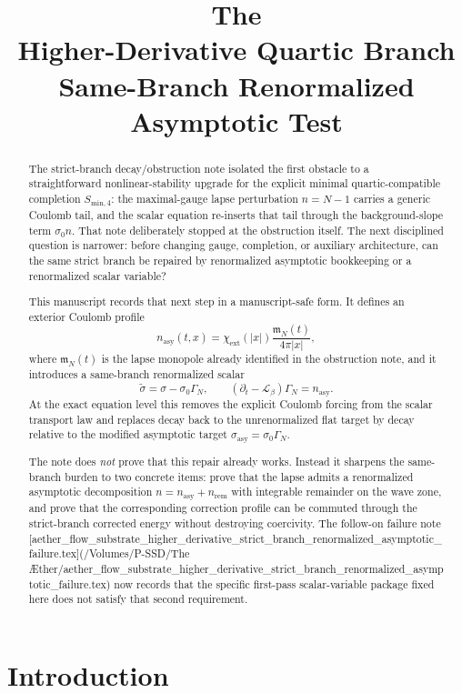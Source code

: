 \documentclass[11pt]{article}
\title{\textbf{The \TheoryName{}}\\[0.4em]
\large Higher-Derivative Quartic Branch Same-Branch Renormalized Asymptotic Test}
\author{}
\date{}
\newcommand{\Ell}{\mathcal{L}}
\begin{document}
\maketitle

\begin{abstract}
The strict-branch decay/obstruction note isolated the first obstacle to a straightforward nonlinear-stability upgrade for the explicit minimal quartic-compatible completion \(S_{\mathrm{min},4}\): the maximal-gauge lapse perturbation \(n=N-1\) carries a generic Coulomb tail, and the scalar equation re-inserts that tail through the background-slope term \(\sigma_0 n\). That note deliberately stopped at the obstruction itself. The next disciplined question is narrower: before changing gauge, completion, or auxiliary architecture, can the same strict branch be repaired by renormalized asymptotic bookkeeping or a renormalized scalar variable?

This manuscript records that next step in a manuscript-safe form. It defines an exterior Coulomb profile
\[
n_{\mathrm{asy}}(t,x)=\chi_{\mathrm{ext}}(|x|)\frac{\mathfrak m_N(t)}{4\pi|x|},
\]
where \(\mathfrak m_N(t)\) is the lapse monopole already identified in the obstruction note, and it introduces a same-branch renormalized scalar
\[
\widetilde{\sigma}=\sigma-\sigma_0\Gamma_N,
\qquad
(\partial_t-\Ell_\beta)\Gamma_N=n_{\mathrm{asy}}.
\]
At the exact equation level this removes the explicit Coulomb forcing from the scalar transport law and replaces decay back to the unrenormalized flat target by decay relative to the modified asymptotic target \(\sigma_{\mathrm{asy}}=\sigma_0\Gamma_N\).

The note does \emph{not} prove that this repair already works. Instead it sharpens the same-branch burden to two concrete items: prove that the lapse admits a renormalized asymptotic decomposition \(n=n_{\mathrm{asy}}+n_{\mathrm{rem}}\) with integrable remainder on the wave zone, and prove that the corresponding correction profile can be commuted through the strict-branch corrected energy without destroying coercivity. The follow-on failure note [aether_flow_substrate_higher_derivative_strict_branch_renormalized_asymptotic_failure.tex](/Volumes/P-SSD/The Æther/aether_flow_substrate_higher_derivative_strict_branch_renormalized_asymptotic_failure.tex) now records that the specific first-pass scalar-variable package fixed here does not satisfy that second requirement.
\end{abstract}

\section{Introduction}
\end{document}
